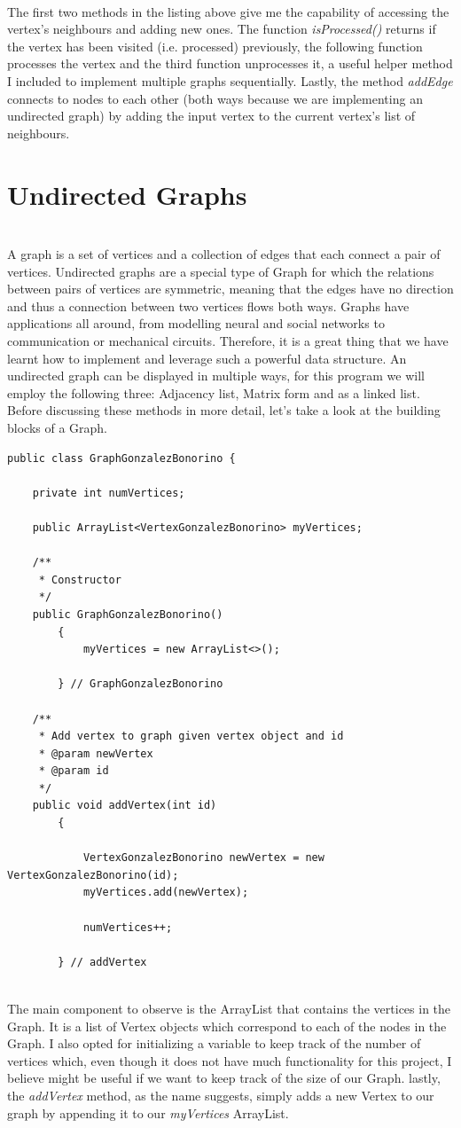 \documentclass[letterpaper, 10pt]{article}
\begin{document}
\\
The first two methods in the listing above give me the capability of accessing the vertex's neighbours and adding new ones. The function \textit{isProcessed()} returns if the vertex has been visited (i.e. processed) previously, the following function processes the vertex and the third function unprocesses it, a useful helper method I included to implement multiple graphs sequentially. Lastly, the method \textit{addEdge} connects to nodes to each other (both ways because we are implementing an undirected graph) by adding the input vertex to the current vertex's list of neighbours.
\\
\section{Undirected Graphs}
\\
A graph is a set of vertices and a collection of edges that each connect a pair of vertices. Undirected graphs are a special type of Graph for which the relations between pairs of vertices are symmetric, meaning that the edges have no direction and thus a connection between two vertices flows both ways. Graphs have applications all around, from modelling neural and social networks to communication or mechanical circuits. Therefore, it is a great thing that we have learnt how to implement and leverage such a powerful data structure. An undirected graph can be displayed in multiple ways, for this program we will employ the following three: Adjacency list, Matrix form and as a linked list. Before discussing these methods in more detail, let's take a look at the building blocks of a  Graph.
\\
\begin{lstlisting}
public class GraphGonzalezBonorino {
	
	private int numVertices;
	
	public ArrayList<VertexGonzalezBonorino> myVertices;
	
	/**
	 * Constructor
	 */
	public GraphGonzalezBonorino()
		{
			myVertices = new ArrayList<>();
			
		} // GraphGonzalezBonorino
	
	/**
	 * Add vertex to graph given vertex object and id
	 * @param newVertex
	 * @param id
	 */
	public void addVertex(int id)
		{	
		
			VertexGonzalezBonorino newVertex = new VertexGonzalezBonorino(id);
			myVertices.add(newVertex);
			
			numVertices++;
			
		} // addVertex
\end{lstlisting}
\\
The main component to observe is the ArrayList that contains the vertices in the Graph. It is a list of Vertex objects which correspond to each of the nodes in the Graph. I also opted for initializing a variable to keep track of the number of vertices which, even though it does not have much functionality for this project, I believe might be useful if we want to keep track of the size of our Graph. lastly, the \textit{addVertex} method, as the name suggests, simply adds a new Vertex to our graph by appending it to our \textit{myVertices} ArrayList.
\end{document}
